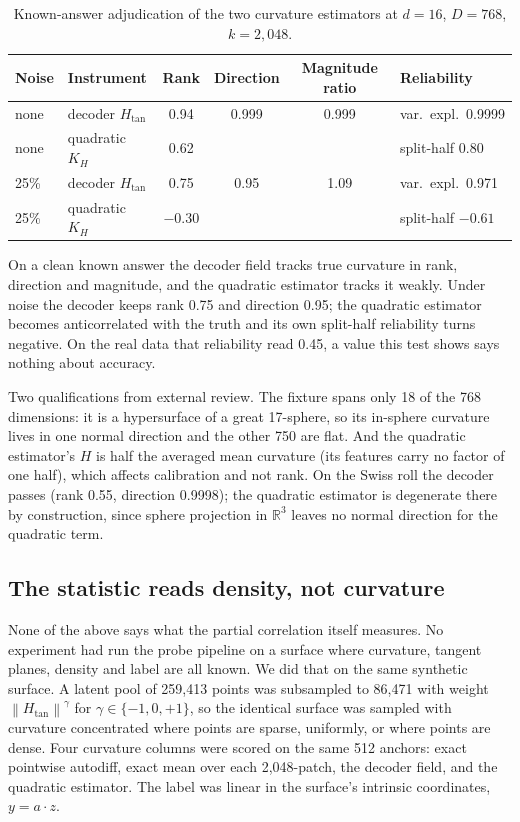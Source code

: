 \documentclass[11pt,a4paper]{article}
\newcommand{\Htan}{H_{\mathrm{tan}}}
\newcommand{\norm}[1]{\left\lVert #1 \right\rVert}
\begin{document}
\begin{table}[h]
\centering
\begin{tabular}{llcccl}
\toprule
Noise & Instrument & Rank & Direction & Magnitude ratio & Reliability \\
\midrule
none & decoder $\Htan$ & 0.94 & 0.999 & 0.999 & var.\ expl.\ 0.9999 \\
none & quadratic $K_H$ & 0.62 & & & split-half 0.80 \\
25\% & decoder $\Htan$ & 0.75 & 0.95 & 1.09 & var.\ expl.\ 0.971 \\
25\% & quadratic $K_H$ & $-0.30$ & & & split-half $-0.61$ \\
\bottomrule
\end{tabular}
\caption{Known-answer adjudication of the two curvature estimators at $d = 16$, $D = 768$, $k = 2{,}048$.}
\label{tab:adjud}
\end{table}

On a clean known answer the decoder field tracks true curvature in rank, direction and magnitude, and the quadratic estimator tracks it weakly. Under noise the decoder keeps rank 0.75 and direction 0.95; the quadratic estimator becomes anticorrelated with the truth and its own split-half reliability turns negative. On the real data that reliability read 0.45, a value this test shows says nothing about accuracy.

Two qualifications from external review. The fixture spans only 18 of the 768 dimensions: it is a hypersurface of a great 17-sphere, so its in-sphere curvature lives in one normal direction and the other 750 are flat. And the quadratic estimator's $H$ is half the averaged mean curvature (its features carry no factor of one half), which affects calibration and not rank. On the Swiss roll the decoder passes (rank 0.55, direction 0.9998); the quadratic estimator is degenerate there by construction, since sphere projection in $\mathbb{R}^3$ leaves no normal direction for the quadratic term.

\subsection{The statistic reads density, not curvature}

None of the above says what the partial correlation itself measures. No experiment had run the probe pipeline on a surface where curvature, tangent planes, density and label are all known. We did that on the same synthetic surface. A latent pool of 259{,}413 points was subsampled to 86{,}471 with weight $\norm{\Htan}^{\gamma}$ for $\gamma \in \{-1, 0, +1\}$, so the identical surface was sampled with curvature concentrated where points are sparse, uniformly, or where points are dense. Four curvature columns were scored on the same 512 anchors: exact pointwise autodiff, exact mean over each 2{,}048-patch, the decoder field, and the quadratic estimator. The label was linear in the surface's intrinsic coordinates, $y = a \cdot z$.
\end{document}
